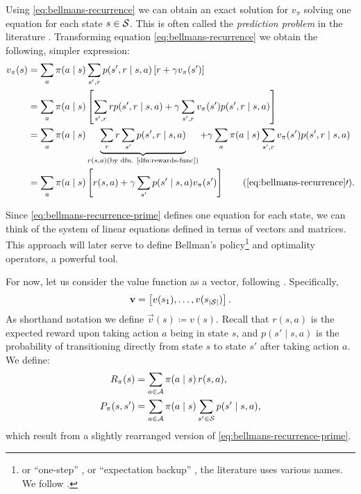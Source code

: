 Using \eqref{eq:bellmans-recurrence} we can obtain an exact solution for $v_\pi$
solving one equation for each state $s \in \mathcal{S}$. This is often called the
\textit{prediction problem} in the literature \cite[Chapter~4.1]{SuttonBarto}.
Transforming equation \eqref{eq:bellmans-recurrence} we obtain the following,
simpler expression:
\begin{align}
\label{eq:bellmans-recurrence-prime}
v_\pi(s) &= \sum_{a} \pi(a \mid s) \sum_{s', r} p(s', r \mid s, a) \left[ r + \gamma v_\pi (s') \right] \nonumber \\
&= \sum_{a} \pi(a \mid s) \left[ \sum_{s', r} r p(s', r \mid s, a) + \gamma \sum_{s', r} v_\pi (s') p(s', r \mid s,a) \right] \nonumber \\
&= \sum_a \pi(a \mid s) \underbrace{\sum_{r} r \sum_{s'} p(s', r \mid s, a)}_{r(s,a) \text{(by dfn. \ref{dfn:rewards-func})}} +
    \gamma \sum_{a} \pi(a \mid s) \sum_{s', r} v_\pi (s') p(s', r \mid s, a) \nonumber \\
&= \sum_{a} \pi(a \mid s) \left[ r(s,a) + \gamma \sum_{s'} p(s' \mid s, a) v_\pi (s') \right] \tag{\ref*{eq:bellmans-recurrence}$\prime$}.
\end{align}

Since \eqref{eq:bellmans-recurrence-prime} defines one equation for each state,
we can think of the system of linear equations defined in terms of vectors and
matrices. This approach will later serve to define Bellman's policy\footnote{or
``one-step'' \cite[pg.~9]{nadeemward2021}, or ``expectation backup''
\cite[Lect.~3, Contraction Mapping]{silver2015}, the literature uses various
names. We follow \cite{raoRL4F}.} and optimality operators, a powerful tool.

For now, let us consider the value function as a vector, following
\cite[pg.~132]{raoRL4F}. Specifically,
\[
    \mathbf{v} = \left[ v (s_1), \dots , v (s_{|\mathcal{S}|}) \right].
\]
As shorthand notation we define $\vec{v}(s) \coloneqq v(s)$. Recall that $r(s,
a)$ is the expected reward upon taking action $a$ being in state $s$, and $p(s'
\mid s, a)$ is the probability of transitioning directly from state $s$ to state
$s'$ after taking action $a$. We define:
\begin{align*}
    R_\pi (s) &= \sum_{a \in \mathcal{A}} \pi(a \mid s) \, r(s,a), \\
    P_\pi (s, s') &= \sum_{a \in \mathcal{A}} \pi(a \mid s) \sum_{s' \in \mathcal{S}} p(s' \mid s, a),
\end{align*}
which result from a slightly rearranged version of
\eqref{eq:bellmans-recurrence-prime}.

